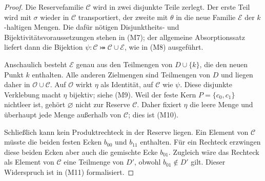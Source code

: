 \documentclass[main.tex]{subfiles}
\begin{document}
\begin{proof}
Die Reservefamilie \(\mathcal C\) wird in zwei disjunkte Teile zerlegt. Der
erste Teil wird mit \(\sigma\) wieder in \(\mathcal C\) transportiert, der
zweite mit \(\theta\) in die neue Familie \(\mathcal E\) der
\(k\)-haltigen Mengen. Die dafür nötigen Disjunktheits- und
Bijektivitätsvoraussetzungen stehen in \textup{(M7)}; der allgemeine
Absorptionssatz liefert dann die Bijektion
\(\psi\colon\mathcal C\bij\mathcal C\cup\mathcal E\), wie in
\textup{(M8)} ausgeführt.

Anschaulich besteht \(\mathcal E\) genau aus den Teilmengen von
\(D\cup\{k\}\), die den neuen Punkt \(k\) enthalten. Alle anderen
Zielmengen sind Teilmengen von \(D\) und liegen daher in
\(\mathcal O\cup\mathcal C\). Auf \(\mathcal O\) wirkt \(\eta\) als
Identität, auf \(\mathcal C\) wie \(\psi\). Diese disjunkte Verklebung macht
\(\eta\) bijektiv; siehe \textup{(M9)}. Weil der feste Kern
\(P=\{c_0,c_1\}\) nichtleer ist, gehört \(\varnothing\) nicht zur Reserve
\(\mathcal C\). Daher fixiert \(\eta\) die leere Menge und überhaupt jede
Menge außerhalb von \(\mathcal C\); dies ist \textup{(M10)}.

Schließlich kann kein Produktrechteck in der Reserve liegen. Ein Element von
\(\mathcal C\) müsste die beiden festen Ecken \(b_{00}\) und \(b_{11}\)
enthalten. Für ein Rechteck erzwingen diese beiden Ecken aber auch die
gemischte Ecke \(b_{01}\). Zugleich wäre das Rechteck als Element von
\(\mathcal C\) eine Teilmenge von \(D'\), obwohl \(b_{01}\notin D'\) gilt.
Dieser Widerspruch ist in \textup{(M11)} formalisiert.
\end{proof}

\MogTableProofHeading
\begin{tabproofwide}
\end{tabproofwide}
\end{document}
